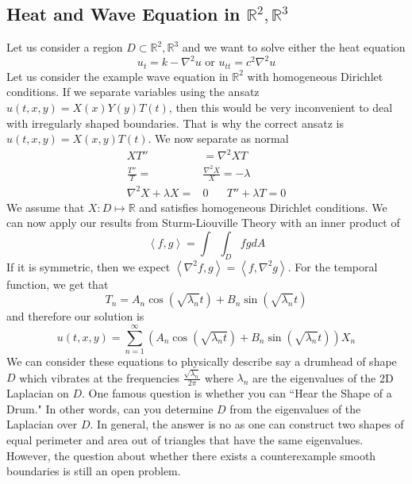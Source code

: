 \documentclass{article}
\newcommand{\R}{\mathbb{R}}
\newcommand{\twen}{\hspace{20pt}}
\newcommand{\ip}[2]{\left\langle #1,#2\right\rangle}
\newcommand{\lap}{\nabla ^2}
\newcommand{\push}{\,\,\,}
\theoremstyle{definition}
\begin{document}
\subsection{Heat and Wave Equation in $\R^2,\R^3$}
Let us consider a region $D \subset \R^2, \R^3$ and we want to solve either the heat equation 
\begin{equation*}
    u_t = k -\lap u \text{ or } u_{tt}=c^2\lap u
\end{equation*}
Let us consider the example wave equation in $\R^2$ with homogeneous Dirichlet conditions. If we separate variables using the ansatz $u(t,x,y) = X(x)Y(y)T(t)$, then this would be very inconvenient to deal with irregularly shaped boundaries. That is why the correct ansatz is $u(t,x,y) = X(x,y)T(t)$. We now separate as normal 
\begin{equation*}
    \begin{split}
        XT'' &= \lap XT \\
        \frac{T''}{T}=&\frac{\lap X}{X} =-\lambda \\
        \lap  X+\lambda X =& 0 \twen T''+\lambda T=0
    \end{split}
\end{equation*}
We assume that $X: D \mapsto \R$ and satisfies homogeneous Dirichlet conditions. We can now apply our results from Sturm-Liouville Theory with an inner product of 
\begin{equation*}
    \ip{f}{g} =\int \push\int_D fg dA
\end{equation*}
If it is symmetric, then we expect $\ip{\lap f}{g} = \ip{f}{\lap g}$. For the temporal function, we get that 
\begin{equation*}
    T_n = A_n \cos \left(\sqrt{\lambda_n} t\right) +B_n \sin \left( \sqrt{\lambda_n} t\right)
\end{equation*}
and therefore our solution is 
\begin{equation*}
    u(t,x,y) = \sum^\infty_{n=1} \left( A_n \cos \left(\sqrt{\lambda_n t} \right) +B_n \sin \left(\sqrt{\lambda_n} t\right) \right) X_n
\end{equation*}
We can consider these equations to physically describe say a drumhead of shape $D$ which vibrates at the frequencies $\frac{\sqrt{\lambda_n}}{2\pi}$ where $\lambda_n$ are the eigenvalues of the 2D Laplacian on $D$. One famous question is whether you can ``Hear the Shape of a Drum." In other words, can you determine $D$ from the eigenvalues of the Laplacian over $D$. In general, the answer is no as one can construct two shapes of equal perimeter and area out of triangles that have the same eigenvalues. However, the question about whether there exists a counterexample smooth boundaries is still an open problem. 
\end{document}
